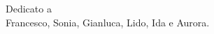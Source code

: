 
\cleardoublepage
{}
\thispagestyle{empty}

\vspace*{3cm}


\bigskip

\begin{center}
Dedicato a \\ \medskip
Francesco, Sonia, Gianluca, Lido, Ida e Aurora.
\end{center}
